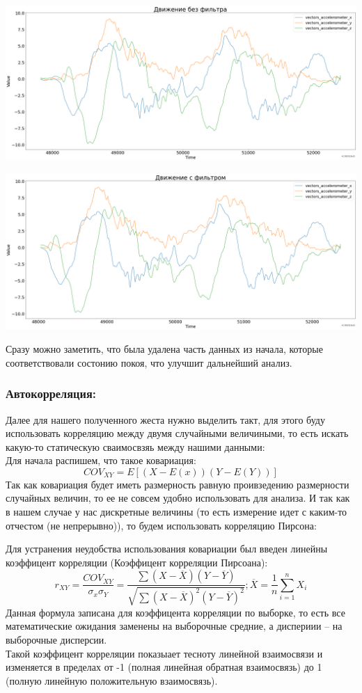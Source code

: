 \documentclass[a4paper]{article}
\begin{document}
\includegraphics[scale = 0.17]{gesture_with_no_filter.png}

\includegraphics[scale = 0.17]{gesture_with_filter.png}

Сразу можно заметить, что была удалена часть данных из начала, которые соответствовали состонию покоя, что улучшит дальнейший анализ.

\subsubsection*{Автокорреляция:}
Далее для нашего полученного жеста нужно выделить такт, для этого буду использовать корреляцию между двумя случайными величиными, то есть искать какую-то статическую сваимосвзяь между нашими данными: \\
Для начала распишем, что такое ковариация:
\[COV_{XY} = E\left[ (X - E(x)) (Y - E(Y))\right]\]
Так как ковариация будет иметь размерность равную проивзедению размерности случайных величин, то ее не совсем удобно использовать для анализа. И так как в нашем случае у нас дискретные величины (то есть измерение идет с каким-то отчестом (не непрерывно)), то будем использовать корреляцию Пирсона:

Для устранения неудобства использования ковариации был введен линейны коэффицент корреляции (Коэффицент корреляции Пирсоана):
\[r_{XY} = \dfrac{COV_{XY}}{\sigma_x \sigma_Y} = \dfrac{\sum (X - \overline{X}) (Y - \overline{Y})}{ \sqrt{\sum (X - \overline{X})^2 (Y - \overline{Y}) ^2} }; \overline{X} = \dfrac{1}{n} \sum_{i = 1}^n X_i\]
Данная формула записана для коэффицента корреляции по выборке, то есть все математические ожидания заменены на выборочные средние, а диспериии -- на выборочные дисперсии. \\
Такой коэффицент корреляции показыает тесноту линейной взаимосвязи и изменяется в пределах от -1 (полная линейная обратная взаимосвязь) до 1 (полную линейную положительную взаимосвязь).
\end{document}
